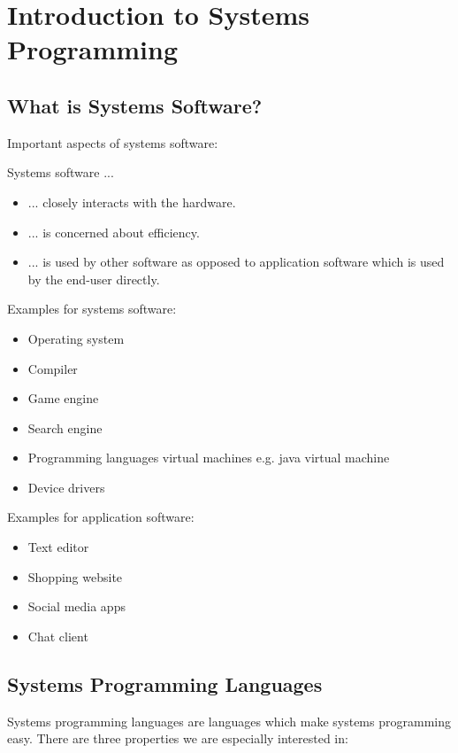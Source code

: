 \section{Introduction to Systems Programming}

\subsection{What is Systems Software?}

Important aspects of systems software:

Systems software ...

\begin{itemize}
    \item ... closely interacts with the hardware.
    \item ... is concerned about efficiency.
    \item ... is used by other software as opposed to application software which is used by the end-user directly.
\end{itemize}

Examples for systems software:

\begin{itemize}
    \item Operating system
    \item Compiler
    \item Game engine
    \item Search engine
    \item Programming languages virtual machines e.g. java virtual machine
    \item Device drivers
\end{itemize}

Examples for application software:

\begin{itemize}
    \item Text editor
    \item Shopping website
    \item Social media apps
    \item Chat client
\end{itemize}

\subsection{Systems Programming Languages}

Systems programming languages are languages which make systems programming easy. There are three properties we are especially interested in:

